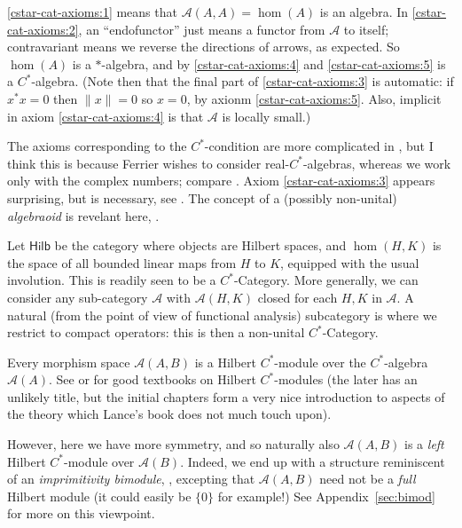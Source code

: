 \documentclass[a4paper,11pt]{article}
\theoremstyle{plain}
\theoremstyle{remark}
\newenvironment{remark}
  {\pushQED{\qed}\renewcommand{\qedsymbol}{$\triangle$}\remarkx}
  {\popQED\endremarkx}
\newenvironment{example}
  {\pushQED{\qed}\renewcommand{\qedsymbol}{$\triangle$}\examplex}
  {\popQED\endexamplex}
\newcommand{\mc}[1]{\mathcal{#1}}
\newcommand{\catHilb}{\textsf{Hilb}}
\begin{document}
\ref{cstar-cat-axioms:1} means that $\mc A(A,A) = \hom(A)$ is an algebra.
In \ref{cstar-cat-axioms:2}, an ``endofunctor'' just means a functor from $\mc A$ to itself; contravariant means we reverse the directions of arrows, as expected.
So $\hom(A)$ is a $*$-algebra, and by \ref{cstar-cat-axioms:4} and \ref{cstar-cat-axioms:5} is a $C^*$-algebra.  (Note then that the final part of \ref{cstar-cat-axioms:3} is automatic: if $x^*x=0$ then $\|x\|=0$ so $x=0$, by axionm \ref{cstar-cat-axioms:5}.  Also, implicit in axiom \ref{cstar-cat-axioms:4} is that $\mc A$ is locally small.)

The axioms corresponding to the $C^*$-condition are more complicated in \cite[Definition 1.2.10]{ferrier_thesis}, but I think this is because Ferrier wishes to consider real-$C^*$-algebras, whereas we work only with the complex numbers; compare \cite[Definition~2.8]{mitchener_cstar_cats}.
Axiom \ref{cstar-cat-axioms:3} appears surprising, but is necessary, see \cite[Example~2.10]{mitchener_cstar_cats}.
The concept of a (possibly non-unital) \emph{algebraoid} is revelant here, \cite{ferrier_thesis,mitchener_cstar_cats}.

\begin{example}
Let $\catHilb$ be the category where objects are Hilbert spaces, and $\hom(H,K)$ is the space of all bounded linear maps from $H$ to $K$, equipped with the usual involution.  This is readily seen to be a $C^*$-Category.  More generally, we can consider any sub-category $\mc A$ with $\mc A(H,K)$ closed for each $H,K$ in $\mc A$.  A natural (from the point of view of functional analysis) subcategory is where we restrict to compact operators: this is then a non-unital $C^*$-Category.
\end{example}

\begin{remark}\label{rem:to_modules}
Every morphism space $\mc A(A,B)$ is a Hilbert $C^*$-module over the $C^*$-algebra $\mc A(A)$.  See \cite{Lance_HilbModsBook} or \cite{RaeburnWilliams_MoritaEquivBook} for good textbooks on Hilbert $C^*$-modules (the later has an unlikely title, but the initial chapters form a very nice introduction to aspects of the theory which Lance's book does not much touch upon).

However, here we have more symmetry, and so naturally also $\mc A(A,B)$ is a \emph{left} Hilbert $C^*$-module over $\mc A(B)$.  Indeed, we end up with a structure reminiscent of an \emph{imprimitivity bimodule}, \cite[Definition~3.1]{RaeburnWilliams_MoritaEquivBook}, excepting that $\mc A(A,B)$ need not be a \emph{full} Hilbert module (it could easily be $\{0\}$ for example!)  See Appendix~\ref{sec:bimod} for more on this viewpoint.
\end{remark}
\end{document}
